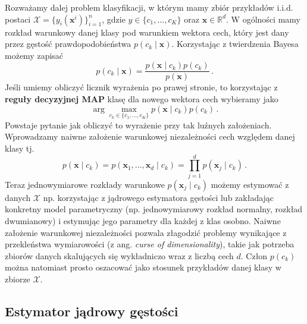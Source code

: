 \documentclass{myclass}
\numberwithin{equation}{section}
\begin{document}
Rozważamy dalej problem klasyfikacji, w którym mamy zbiór przykładów i.i.d. postaci \(\mathcal{X} =
\{y_i(\mathbf{x}^i)\}_{i=1}^n\), gdzie \(y \in \{c_1, \ldots, c_K\} \) oraz \(\mathbf{x} \in
\mathbb{R}^d\). W ogólności mamy rozkład warunkowy danej klasy pod warunkiem wektora cech, który
jest dany przez gęstość prawdopodobieństwa \(p(c_k \mid \mathbf{x})\). Korzystając z twierdzenia
Bayesa możemy zapisać
\begin{equation}
    p(c_k \mid \mathbf{x}) = \frac{p(\mathbf{x} \mid c_k) p(c_k)}{p(\mathbf{x})}\,.
\end{equation}
Jeśli umiemy obliczyć licznik wyrażenia po prawej stronie, to korzystając z \textbf{reguły
decyzyjnej MAP} klasę dla nowego wektora cech wybieramy jako
\begin{equation}
    \arg\max_{c_k \in \{c_1, \ldots, c_K\}} p(\mathbf{x} \mid c_k) p(c_k)\,.
\end{equation}
Powstaje pytanie jak obliczyć to wyrażenie przy tak luźnych założeniach. Wprowadzamy naiwne
założenie warunkowej niezależności cech względem danej klasy tj.
\begin{equation}
    p(\mathbf{x} \mid c_k) = p(\mathbf{x}_1, \ldots, \mathbf{x}_d \mid c_k) = \prod_{j=1}^d p(\mathbf{x}_j \mid c_k)\,.
\end{equation}
Teraz jednowymiarowe rozkłady warunkowe \(p(\mathbf{x}_j \mid c_k)\) możemy estymować z danych
\(\mathcal{X}\) np. korzystając z jądrowego estymatora gęstości lub zakładając konkretny model
parametryczny (np. jednowymiarowy rozkład normalny, rozkład dwumianowy) i estymując jego parametry
dla każdej z klas osobno. Naiwne założenie warunkowej niezależności pozwala złagodzić problemy
wynikające z przekleństwa wymiarowości (z ang. \textit{curse of dimensionality}), takie jak potrzeba
zbiorów danych skalujących się wykładniczo wraz z liczbą cech \(d\). Człon \(p(c_k)\) można
natomiast prosto oszacować jako stosunek przykładów danej klasy w zbiorze \(\mathcal{X}\).


\subsection{Estymator jądrowy gęstości}
\end{document}
